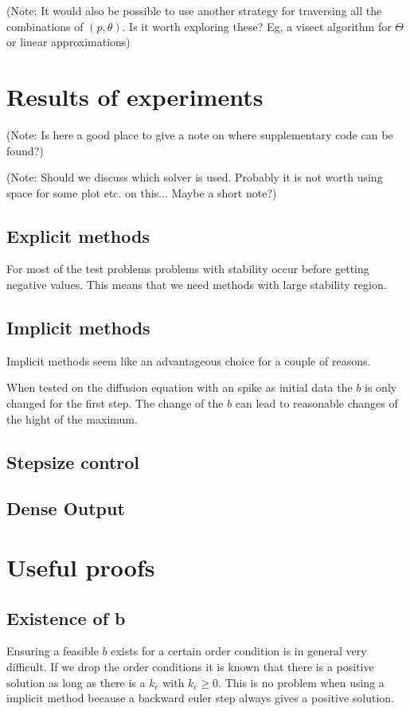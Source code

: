 \documentclass{article}
\begin{document}
(Note: It would also be possible to use another strategy for traversing all the combinations of $(p,\theta)$. Is it worth exploring these? Eg, a visect algorithm for $\Theta$ or linear approximations)



\section{Results of experiments}\label{sec:Numeric_Results}

(Note: Is here a good place to give a note on where supplementary code can be found?)

(Note: Should we discuss which solver is used. Probably it is not worth using space for some plot etc. on this... Maybe a short note?)


\subsection{Explicit methods}
For most of the test problems problems with stability occur before getting negative values. This means that we need methods with large stability region.



\subsection{Implicit methods}
Implicit methods seem like an advantageous choice for a couple of reasons.

When tested on the diffusion equation with an spike as initial data the $b$ is only changed for the first step. The change of the $b$ can lead to reasonable changes of the hight of the maximum. 

\subsection{Stepsize control}

\subsection{Dense Output}

\section{Useful proofs}

\subsection{Existence of b}
Ensuring a feasible $b$ exists for a certain order condition is in general very difficult.
If we drop the order conditions it is known that there is a positive solution as long as there is a $k_c$ with $k_c \geq 0$.
This is no problem when using a implicit method because a backward euler step always gives a positive solution. 
\end{document}
